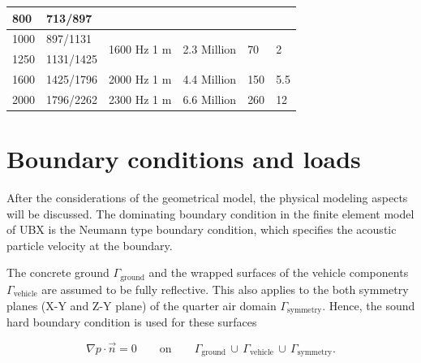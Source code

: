 \begin{table}[H]
\begin{tabularx}{\textwidth}{|X|X|c|X|X|X|}
		800                              & 713/897                    &                                 &                               &                         &                                        \\ \hline
		1000                             & 897/1131                   & \multirow{2}{*}{1600 Hz 1 m}    & \multirow{2}{*}{2.3 Million}  & \multirow{2}{*}{70}     & \multirow{2}{*}{2}                     \\ \cline{1-2}
		1250                             & 1131/1425                  &                                 &                               &                         &                                        \\ \hline
		1600                             & 1425/1796                  & 2000 Hz 1 m                     & 4.4 Million                   & 150                     & 5.5                                    \\ \hline
		2000                             & 1796/2262                  & 2300 Hz 1 m                     & 6.6 Million                   & 260                     & 12                                     \\ \hline
	\end{tabularx}
\end{table}


\section{Boundary conditions and loads}
\label{section:boundary_conditions}

After the considerations of the geometrical model, the physical modeling aspects will be discussed. The dominating boundary condition in the finite element model of UBX is the Neumann type boundary condition, which specifies the acoustic particle velocity at the boundary.

The concrete ground $\Gamma_{\text{ground}}$ and the wrapped surfaces of the vehicle components $\Gamma_{\text{vehicle}}$ are assumed to be fully reflective. This also applies to the both symmetry planes (X-Y and Z-Y plane) of the quarter air domain $\Gamma_{\text{symmetry}}$. Hence, the sound hard boundary condition is used for these surfaces

\begin{equation}
	\nabla p \cdot \vec{n} = 0\qquad\text{on}\qquad\Gamma_{\text{ground}}\,\cup\,\Gamma_{\text{vehicle}}\,\cup\,\Gamma_{\text{symmetry}}\text{.}
\end{equation}



